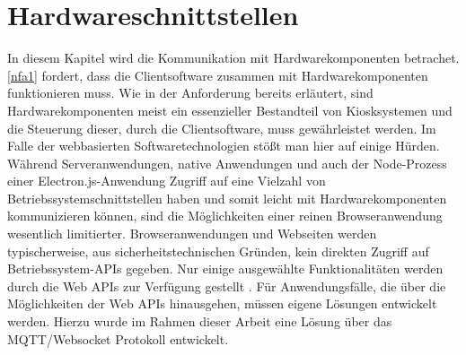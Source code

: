 \chapter{Hardwareschnittstellen}
\label{chap:hardwareschnittstellen}

In diesem Kapitel wird die Kommunikation mit Hardwarekomponenten betrachet.
\ref{nfa1} fordert, dass die Clientsoftware zusammen mit Hardwarekomponenten funktionieren muss. Wie in
der Anforderung bereits erläutert, sind Hardwarekomponenten meist ein essenzieller Bestandteil von Kiosksystemen
und die Steuerung dieser, durch die Clientsoftware, muss gewährleistet werden. Im Falle der webbasierten 
Softwaretechnologien stößt man hier auf einige Hürden.\\
Während Serveranwendungen, native Anwendungen und auch der Node-Prozess einer 
Electron.js-Anwendung Zugriff auf eine Vielzahl von Betriebssystemschnittstellen haben  
und somit leicht mit Hardwarekomponenten kommunizieren können, sind
die Möglichkeiten einer reinen Browseranwendung wesentlich limitierter. Browseranwendungen und Webseiten werden
typischerweise, aus sicherheitstechnischen Gründen, kein direkten Zugriff auf Betriebssystem-APIs gegeben.
Nur einige ausgewählte Funktionalitäten werden durch die Web APIs zur Verfügung gestellt \cite{web-apis}.
Für Anwendungsfälle, die über die Möglichkeiten der Web APIs hinausgehen, müssen eigene Lösungen entwickelt 
werden. Hierzu wurde im Rahmen dieser Arbeit eine Lösung über das MQTT/Websocket Protokoll entwickelt.


